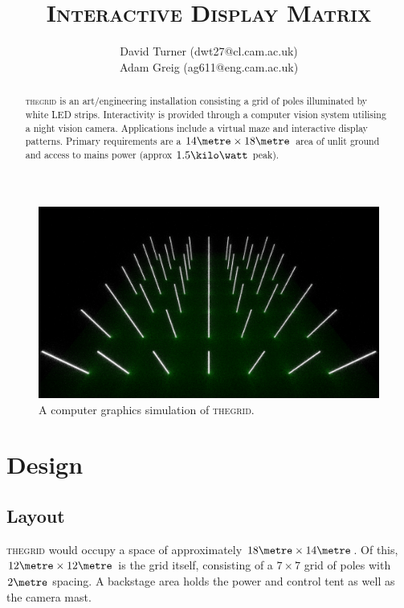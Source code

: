 \documentclass[12pt]{article} %
\title{\thegrid\\\small{\textsc{Interactive Display Matrix}}}
\author{\small{David Turner (dwt27@cl.cam.ac.uk)}\\\small{Adam Greig (ag611@eng.cam.ac.uk)}}
\date{} %
\newcommand{\thegrid}{\textsc{the\textperiodcentered grid}\xspace}
\begin{document}
\maketitle

\renewcommand{\abstractname}{Summary}
\begin{abstract}
\thegrid is an art/engineering installation consisting a grid of poles illuminated by white LED strips.  Interactivity is provided through a computer vision system utilising a night vision camera.  Applications include a virtual maze and interactive display patterns.  Primary requirements are a $14\metre \times 18\metre$ area of unlit ground and access to mains power (approx $1.5\kilo\watt$ peak).
\end{abstract}

\begin{figure}[h]
    \centering
    \includegraphics[width=\textwidth]{pics/render1.png}
    \caption{A computer graphics simulation of \thegrid.}
\end{figure}

\clearpage
\section{Design}
\subsection{Layout}
\thegrid would occupy a space of approximately $18\metre \times 14\metre$.  Of this, $12\metre \times 12\metre$ is the grid itself, consisting of a $7 \times 7$ grid of poles with $2\metre$ spacing.  A backstage area holds the power and control tent as well as the camera mast.
\end{document}
